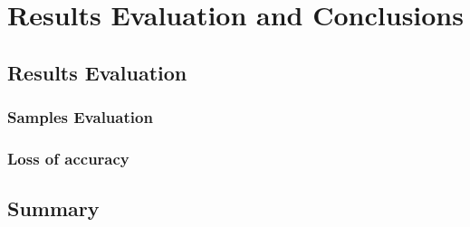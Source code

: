 \chapter{Results Evaluation and Conclusions}
\section{Results Evaluation}
\subsection{Samples Evaluation}
\subsection{Loss of accuracy}
\section{Summary}